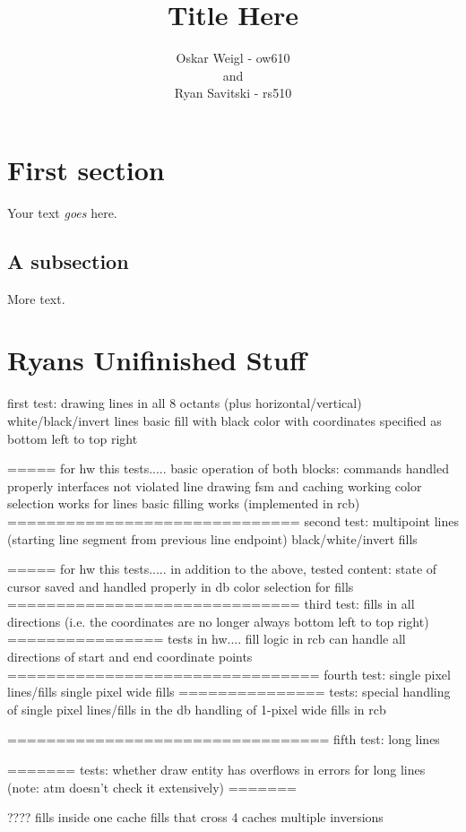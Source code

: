 \documentclass[]{article}
\title{Title Here}
\author{Oskar Weigl - ow610\\ and \\ Ryan Savitski - rs510}
\begin{document}
\maketitle



\section{First section}

Your text \emph{goes} here.

\subsection{A subsection}

More text.

\section{Ryans Unifinished Stuff} %
\label{sec:ryans_unifinished_stuff}

first test:
drawing lines in all 8 octants (plus horizontal/vertical)
white/black/invert lines
basic fill with black color with coordinates specified as bottom left to top right

=====
for hw this tests.....
basic operation of both blocks:
 commands handled properly 
 interfaces not violated 
 line drawing fsm and caching working
 color selection works for lines
 basic filling works (implemented in rcb)
==============================
second test:
multipoint lines (starting line segment from previous line endpoint)
black/white/invert fills

=====
for hw this tests.....
in addition to the above, tested content:
 state of cursor saved and handled properly in db
 color selection for fills
==============================
third test:
fills in all directions (i.e. the coordinates are no longer always bottom left to top right)
================
tests in hw....
 fill logic in rcb can handle all directions of start and end coordinate points
================================
fourth test:
single pixel lines/fills
single pixel wide fills
===============
tests:
 special handling of single pixel lines/fills in the db
 handling of 1-pixel wide fills in rcb
 
=================================
fifth test: 
long lines

=======
tests:
 whether draw entity has overflows in errors for long lines (note: atm doesn't check it extensively)
=======


????
fills inside one cache
fills that cross 4 caches
multiple inversions

\end{document}
